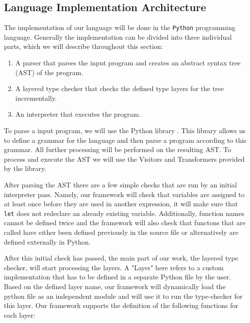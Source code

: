\subsection{Language Implementation Architecture}
\label{ssec:architecture}

The implementation of our language will be done in the \texttt{Python} programming language. Generally the implementation can be divided into three individual parts, which we will describe throughout this section:

\begin{enumerate}
	\item A parser that parses the input program and creates an abstract syntax tree (AST) of the program.
	\item A layered type checker that checks the defined type layers for the tree incrementally.
	\item An interpreter that executes the program.
\end{enumerate}

To parse a input program, we will use the Python library \Lark{} \cite{Lark}. This library allows us to define a grammar for the language and then parse a program according to this grammar. All further processing will be performed on the resulting AST. To process and execute the AST we will use the Visitors and Transformers provided by the \Lark{} library.

After parsing the AST there are a few simple checks that are run by an initial interpreter pass. Namely, our framework will check that variables are assigned to at least once before they are used in another expression, it will make sure that \texttt{let} does not redeclare an already existing variable. Additionally, function names cannot be defined twice and the framework will also check that functons that are called have either been defined previously in the source file or alternatively are defined externally in Python.

After this initial check has passed, the main part of our work, the layered type checker, will start processing the layers. A "Layer" here refers to a custom implementation that has to be defined in a separate Python file by the user. Based on the defined layer name, our framework will dynamically load the python file as an independent module and will use it to run the type-checker for this layer. Our framework supports the definition of the following functions for each layer:

